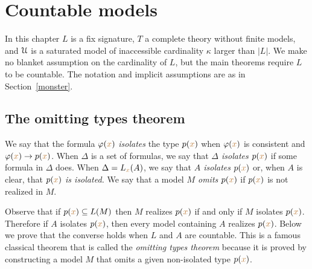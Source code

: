 \chapter{Countable models}
\label{countable}

\def\ceq#1#2#3{\parbox[b]{30ex}{$\displaystyle #1$}\parbox[b]{6ex}{\hfil$#2$}$\displaystyle #3$}

In this chapter $L$ is a fix signature, $T$ a complete theory without finite models, and $\EuScript U$ is a saturated model of inaccessible cardinality $\kappa$ larger than $|L|$.
We make no blanket assumption on the cardinality of $L$, but the main theorems require $L$ to be countable.
The notation and implicit assumptions are as in Section~\ref{monster}.



\section{The omitting types theorem}\label{omttingtype}

We say that the formula $\varphi({\color{brown} x})$ \emph{isolates\/} the type $p({\color{brown} x})$ when $\varphi({\color{brown} x})$ is consistent and $\varphi({\color{brown} x})\rightarrow p({\color{brown} x})$.
When $\Delta$ is a set of formulas, we say that \emph{$\Delta$ isolates $p({\color{brown} x})$\/} if some formula in $\Delta$ does.
When $\Delta=L_{{\color{brown} x}}(A)$, we say that \emph{$A$ isolates $p({\color{brown} x})$\/} or, when $A$ is clear, that \emph{$p({\color{brown} x})$ is isolated.}
We say that a model \emph{$M$ omits $p({\color{brown} x})$\/} if $p({\color{brown} x})$ is not realized in $M$.

Observe that if $p({\color{brown} x})\subseteq L(M)$ then $M$ realizes $p({\color{brown} x})$ if and only if $M$ isolates  $p({\color{brown} x})$.
Therefore if $A$ isolates $p({\color{brown} x})$, then every model containing $A$ realizes $p({\color{brown} x})$.
Below we prove that the converse holds when $L$ and $A$ are countable.
This is a famous classical theorem that is called the \textit{omitting types theorem\/} because it is proved by constructing a model $M$ that omits a given non-isolated type $p({\color{brown} x})$.



